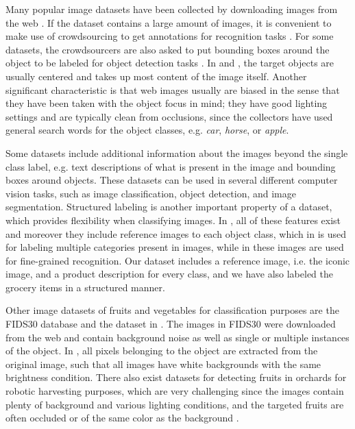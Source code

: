 Many popular image datasets have been collected by downloading images from the web . 
If the dataset contains a large amount of images, it is convenient to make use of crowdsourcing to get annotations for recognition tasks . For some datasets, the crowdsourcers are also asked to put bounding boxes around the object to be labeled for object detection tasks . In  and , the target objects are usually centered and takes up most content of the image itself. Another significant characteristic is that web images usually are biased in the sense that they have been taken with the object focus in mind; they have good lighting settings and are typically clean from occlusions, since the collectors have used general search words for the object classes, e.g. \textit{car}, \textit{horse}, or \textit{apple}.

Some datasets include additional information about the images beyond the single class label, e.g. text descriptions of what is present in the image and bounding boxes around objects. These datasets can be used in several different computer vision tasks, such as image classification, object detection, and image segmentation. Structured labeling is another important property of a dataset, which provides flexibility when classifying images. In  , all of these features exist and moreover they include reference images to each object class, which in  is used for labeling multiple  categories present in images, while in  these images are used for fine-grained recognition. 
Our dataset includes a reference image, i.e. the iconic image, and a product description for every class, and we have also labeled the grocery items in a structured manner.

Other image datasets of fruits and vegetables for classification purposes are the FIDS30 database  and the dataset in . The images in FIDS30 were downloaded from the web and contain background noise as well as single or multiple instances of the object. In , all pixels belonging to the object are extracted from the original image, such that all images have white backgrounds with the same brightness condition. There also exist datasets for detecting fruits in orchards for robotic harvesting purposes, which are very challenging since the images contain plenty of background and various lighting conditions, and the targeted fruits are often occluded or of the same color as the background .

